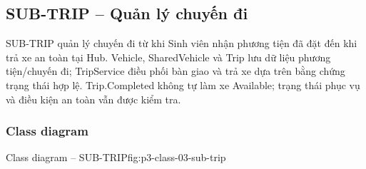 \par\medskip
\noindent\begin{minipage}{\linewidth}
\subsection{SUB-TRIP -- Quản lý chuyến đi}
SUB-TRIP quản lý chuyến đi từ khi Sinh viên nhận phương tiện đã đặt đến khi trả xe an toàn tại Hub. Vehicle, SharedVehicle và Trip lưu dữ liệu phương tiện/chuyến đi; TripService điều phối bàn giao và trả xe dựa trên bằng chứng trạng thái hợp lệ. Trip.Completed không tự làm xe Available; trạng thái phục vụ và điều kiện an toàn vẫn được kiểm tra.

\subsubsection{Class diagram}
{Class diagram -- SUB-TRIP}{fig:p3-class-03-sub-trip}
\end{minipage}\par


